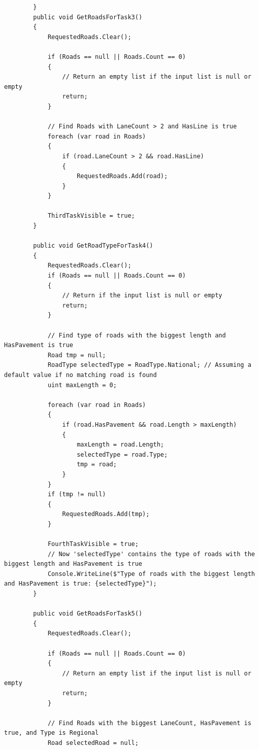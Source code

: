 \documentclass[14pt]{extarticle}
\begin{document}
\begin{verbatim}
        }
        public void GetRoadsForTask3()
        {
            RequestedRoads.Clear();

            if (Roads == null || Roads.Count == 0)
            {
                // Return an empty list if the input list is null or empty
                return;
            }

            // Find Roads with LaneCount > 2 and HasLine is true
            foreach (var road in Roads)
            {
                if (road.LaneCount > 2 && road.HasLine)
                {
                    RequestedRoads.Add(road);
                }
            }

            ThirdTaskVisible = true;
        }

        public void GetRoadTypeForTask4()
        {
            RequestedRoads.Clear();
            if (Roads == null || Roads.Count == 0)
            {
                // Return if the input list is null or empty
                return;
            }

            // Find type of roads with the biggest length and HasPavement is true
            Road tmp = null;
            RoadType selectedType = RoadType.National; // Assuming a default value if no matching road is found
            uint maxLength = 0;

            foreach (var road in Roads)
            {
                if (road.HasPavement && road.Length > maxLength)
                {
                    maxLength = road.Length;
                    selectedType = road.Type;
                    tmp = road;
                }
            }
            if (tmp != null)
            {
                RequestedRoads.Add(tmp);
            }

            FourthTaskVisible = true;
            // Now 'selectedType' contains the type of roads with the biggest length and HasPavement is true
            Console.WriteLine($"Type of roads with the biggest length and HasPavement is true: {selectedType}");
        }

        public void GetRoadsForTask5()
        {
            RequestedRoads.Clear();

            if (Roads == null || Roads.Count == 0)
            {
                // Return an empty list if the input list is null or empty
                return;
            }

            // Find Roads with the biggest LaneCount, HasPavement is true, and Type is Regional
            Road selectedRoad = null;


\end{verbatim}
\end{document}

